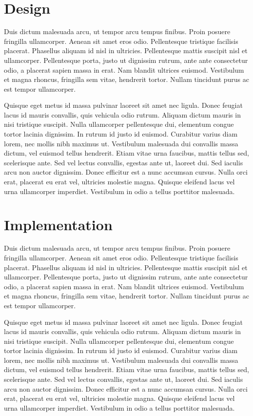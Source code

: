 \documentclass[conference]{IEEEtran}
\begin{document}
\section{Design}

Duis dictum malesuada arcu, ut tempor arcu tempus finibus. Proin posuere fringilla ullamcorper. Aenean sit amet eros odio. Pellentesque tristique facilisis placerat. Phasellus aliquam id nisl in ultricies. Pellentesque mattis suscipit nisl et ullamcorper. Pellentesque porta, justo ut dignissim rutrum, ante ante consectetur odio, a placerat sapien massa in erat. Nam blandit ultrices euismod. Vestibulum et magna rhoncus, fringilla sem vitae, hendrerit tortor. Nullam tincidunt purus ac est tempor ullamcorper.

Quisque eget metus id massa pulvinar laoreet sit amet nec ligula. Donec feugiat lacus id mauris convallis, quis vehicula odio rutrum. Aliquam dictum mauris in nisi tristique suscipit. Nulla ullamcorper pellentesque dui, elementum congue tortor lacinia dignissim. In rutrum id justo id euismod. Curabitur varius diam lorem, nec mollis nibh maximus ut. Vestibulum malesuada dui convallis massa dictum, vel euismod tellus hendrerit. Etiam vitae urna faucibus, mattis tellus sed, scelerisque ante. Sed vel lectus convallis, egestas ante ut, laoreet dui. Sed iaculis arcu non auctor dignissim. Donec efficitur est a nunc accumsan cursus. Nulla orci erat, placerat eu erat vel, ultricies molestie magna. Quisque eleifend lacus vel urna ullamcorper imperdiet. Vestibulum in odio a tellus porttitor malesuada.

\section{Implementation}

Duis dictum malesuada arcu, ut tempor arcu tempus finibus. Proin posuere fringilla ullamcorper. Aenean sit amet eros odio. Pellentesque tristique facilisis placerat. Phasellus aliquam id nisl in ultricies. Pellentesque mattis suscipit nisl et ullamcorper. Pellentesque porta, justo ut dignissim rutrum, ante ante consectetur odio, a placerat sapien massa in erat. Nam blandit ultrices euismod. Vestibulum et magna rhoncus, fringilla sem vitae, hendrerit tortor. Nullam tincidunt purus ac est tempor ullamcorper.

Quisque eget metus id massa pulvinar laoreet sit amet nec ligula. Donec feugiat lacus id mauris convallis, quis vehicula odio rutrum. Aliquam dictum mauris in nisi tristique suscipit. Nulla ullamcorper pellentesque dui, elementum congue tortor lacinia dignissim. In rutrum id justo id euismod. Curabitur varius diam lorem, nec mollis nibh maximus ut. Vestibulum malesuada dui convallis massa dictum, vel euismod tellus hendrerit. Etiam vitae urna faucibus, mattis tellus sed, scelerisque ante. Sed vel lectus convallis, egestas ante ut, laoreet dui. Sed iaculis arcu non auctor dignissim. Donec efficitur est a nunc accumsan cursus. Nulla orci erat, placerat eu erat vel, ultricies molestie magna. Quisque eleifend lacus vel urna ullamcorper imperdiet. Vestibulum in odio a tellus porttitor malesuada.
\end{document}

